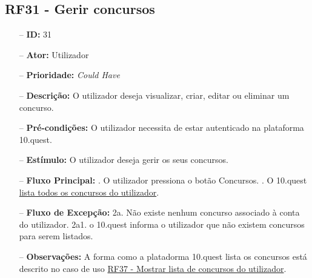\subsection{RF31 - Gerir concursos}
\begin{itemize}
	\item[--] \textbf{ID:} 31
	\item[--]  \textbf{Ator:} Utilizador
	\item[--]  \textbf{Prioridade:} \textit{Could Have}
	\item[--]  \textbf{Descrição:} O utilizador deseja visualizar, criar, editar ou eliminar um concurso.
	\item[--]  \textbf{Pré-condições:} O utilizador necessita de estar autenticado na plataforma 10.quest.
	\item[--]  \textbf{Estímulo:} O utilizador deseja gerir os seus concursos.
	\item[--]  \textbf{Fluxo Principal:} 
	. O utilizador pressiona o botão Concursos.
	. O 10.quest  \underline{lista todos os concursos do utilizador}.
	\item[--]  \textbf{Fluxo de Excepção:} 
	\subitem 2a. Não existe nenhum concurso associado à conta do utilizador.
	\subitem 2a1. o 10.quest informa o utilizador que não existem concursos para serem listados.
	\item[--]  \textbf{Observações:} A forma como a platadorma 10.quest lista os concursos está descrito no caso de uso \underline{RF37 - Mostrar lista de concursos do utilizador}.
\end{itemize}
\newpage

